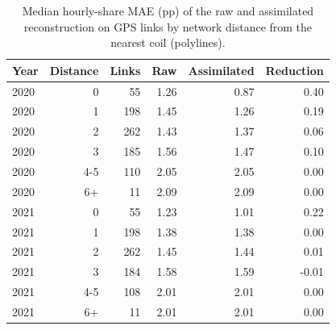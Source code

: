 \begin{table}[htbp]\centering
\caption{Median hourly-share MAE (pp) of the raw and assimilated reconstruction on GPS links by network distance from the nearest coil (polylines).}
\label{tab:distance}
\begin{tabular}{@{}lrrrrr@{}}\toprule
Year & Distance & Links & Raw & Assimilated & Reduction \\\midrule
2020 & 0 & 55 & 1.26 & 0.87 & 0.40 \\
2020 & 1 & 198 & 1.45 & 1.26 & 0.19 \\
2020 & 2 & 262 & 1.43 & 1.37 & 0.06 \\
2020 & 3 & 185 & 1.56 & 1.47 & 0.10 \\
2020 & 4-5 & 110 & 2.05 & 2.05 & 0.00 \\
2020 & 6+ & 11 & 2.09 & 2.09 & 0.00 \\
2021 & 0 & 55 & 1.23 & 1.01 & 0.22 \\
2021 & 1 & 198 & 1.38 & 1.38 & 0.00 \\
2021 & 2 & 262 & 1.45 & 1.44 & 0.01 \\
2021 & 3 & 184 & 1.58 & 1.59 & -0.01 \\
2021 & 4-5 & 108 & 2.01 & 2.01 & 0.00 \\
2021 & 6+ & 11 & 2.01 & 2.01 & 0.00 \\
\bottomrule\end{tabular}\end{table}

